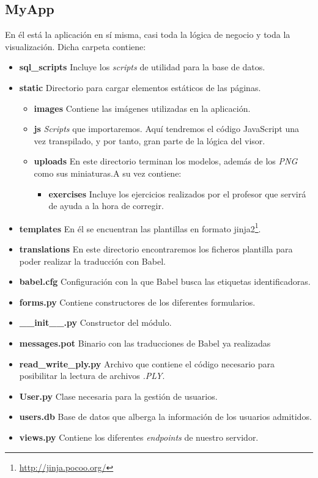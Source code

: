 \subsection{MyApp}
En él está la aplicación en sí misma, casi toda la lógica de negocio y toda la visualización. Dicha carpeta contiene:
\begin{itemize}
	\item \textbf{sql\_scripts} Incluye los \textit{scripts} de utilidad para la base de datos.
	\item \textbf{static} Directorio para cargar elementos estáticos de las páginas.
	\begin{itemize}
		\item \textbf{images} Contiene las imágenes utilizadas en la aplicación.
		\item \textbf{js} \textit{Scripts} que importaremos. Aquí tendremos el código JavaScript una vez transpilado, y por tanto, gran parte de la lógica del visor.
		\item \textbf{uploads} En este directorio terminan los modelos, además de los \textit{PNG} como sus miniaturas.A su vez contiene:
		\begin{itemize}
			\item \textbf{exercises} Incluye los ejercicios realizados por el profesor que servirá de ayuda a la hora de corregir.
		\end{itemize}
	\end{itemize}
	\item \textbf{templates} En él se encuentran las plantillas en formato jinja2\footnote{\url{http://jinja.pocoo.org/}}.
	\item \textbf{translations} En este directorio encontraremos los ficheros plantilla para poder realizar la traducción con Babel.
	\item \textbf{babel.cfg} Configuración con la que Babel busca las etiquetas identificadoras.
	\item \textbf{forms.py} Contiene constructores de los diferentes formularios.
	\item \textbf{\_\_init\_\_.py} Constructor del módulo.
	\item \textbf{messages.pot} Binario con las traducciones de Babel ya realizadas
	\item \textbf{read\_write\_ply.py} Archivo que contiene el código necesario para posibilitar la lectura de archivos \textit{.PLY}.
	\item \textbf{User.py} Clase necesaria para la gestión de usuarios.
	\item \textbf{users.db} Base de datos que alberga la información de los usuarios admitidos.
	\item \textbf{views.py} Contiene los diferentes \textit{endpoints} de nuestro servidor.
\end{itemize}

